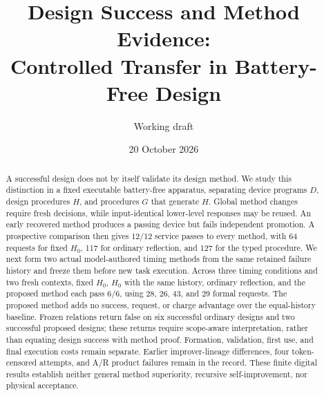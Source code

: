 \documentclass[10pt]{article}
\title{Design Success and Method Evidence:\\Controlled Transfer in Battery-Free Design}
\author{Working draft}
\date{20 October 2026}
\begin{document}
\maketitle
\begin{abstract}
A successful design does not by itself validate its design method. We study this
distinction in a fixed executable battery-free apparatus, separating device
programs $D$, design procedures $H$, and procedures $G$ that generate $H$.
Global method changes require fresh decisions, while input-identical lower-level
responses may be reused. An early recovered method produces a passing device but
fails independent promotion. A prospective comparison then gives 12/12 service
passes to every method, with 64 requests for fixed $H_0$, 117 for ordinary
reflection, and 127 for the typed procedure. We next form two actual
model-authored timing methods from the same retained failure history and freeze
them before new task execution. Across three timing conditions and two fresh
contexts, fixed $H_0$, $H_0$ with the same history, ordinary reflection, and the
proposed method each pass 6/6, using 28, 26, 43, and 29 formal requests.
The proposed method adds no success, request, or charge advantage over the
equal-history baseline. Frozen relations return false on six successful ordinary
designs and two successful proposed designs; these returns require scope-aware
interpretation, rather than equating design success with method proof. Formation,
validation, first use, and final execution costs remain separate. Earlier
improver-lineage differences, four token-censored attempts, and A/R product
failures remain in the record. These finite digital results establish neither
general method superiority, recursive self-improvement, nor physical acceptance.
\end{abstract}

\end{document}
